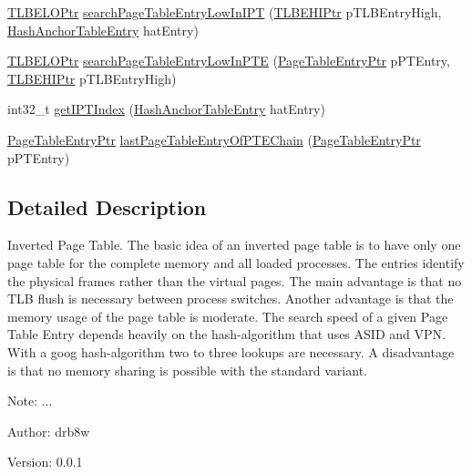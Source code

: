 \begin{CompactItemize}
\item 
\hyperlink{struct_t_l_b_e_l_o}{TLBELOPtr} \hyperlink{group___v_m_m___i_p_t_ga1a233ecd4f829d64f29c55c5c2b369b}{searchPageTableEntryLowInIPT} (\hyperlink{struct_t_l_b_e_h_i}{TLBEHIPtr} pTLBEntryHigh, \hyperlink{group___v_m_m___h_a_t_g06b98a0b294446afee1b27a04682d7c2}{HashAnchorTableEntry} hatEntry)
\item 
\hyperlink{struct_t_l_b_e_l_o}{TLBELOPtr} \hyperlink{group___v_m_m___i_p_t_g4d5cd060a657ba3d732c739461a583a9}{searchPageTableEntryLowInPTE} (\hyperlink{struct_page_table_entry}{PageTableEntryPtr} pPTEntry, \hyperlink{struct_t_l_b_e_h_i}{TLBEHIPtr} pTLBEntryHigh)
\item 
int32\_\-t \hyperlink{group___v_m_m___i_p_t_g84c6b60a0c0d560611edc86fd07a072f}{getIPTIndex} (\hyperlink{group___v_m_m___h_a_t_g06b98a0b294446afee1b27a04682d7c2}{HashAnchorTableEntry} hatEntry)
\item 
\hyperlink{struct_page_table_entry}{PageTableEntryPtr} \hyperlink{group___v_m_m___i_p_t_g5bf5d5affcca902498ae333f71928885}{lastPageTableEntryOfPTEChain} (\hyperlink{struct_page_table_entry}{PageTableEntryPtr} pPTEntry)
\end{CompactItemize}


\subsection{Detailed Description}
Inverted Page Table. The basic idea of an inverted page table is to have only one page table for the complete memory and all loaded processes. The entries identify the physical frames rather than the virtual pages. The main advantage is that no TLB flush is necessary between process switches. Another advantage is that the memory usage of the page table is moderate. The search speed of a given Page Table Entry depends heavily on the hash-algorithm that uses ASID and VPN. With a goog hash-algorithm two to three lookups are necessary. A disadvantage is that no memory sharing is possible with the standard variant. 

\begin{Desc}
\item[Note:]... \end{Desc}
\begin{Desc}
\item[Author:]drb8w \end{Desc}
\begin{Desc}
\item[Version:]0.0.1 \end{Desc}


